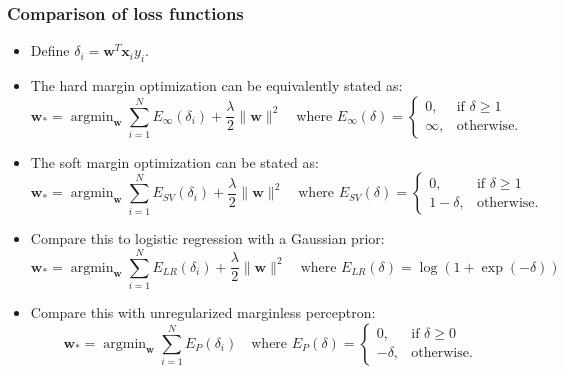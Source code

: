 \documentclass[ignorenonframetext,plain,fleqn]{beamer}
\DeclareMathOperator*{\argmin}{argmin}
\renewcommand{\vec}{\mathbf}
\begin{document}
\begin{frame}\frametitle{Comparison of loss functions} %
\small
\begin{itemize}
\item Define $\delta_i = \vec{w}^T\vec{x}_i y_i$.
\item The hard margin optimization can be equivalently stated as: \[
  \vec{w}_* = \argmin_\vec{w} \sum_{i=1}^N E_\infty(\delta_i) + \frac{\lambda}{2} \|\vec{w}\|^2
\quad\text{where }
E_\infty(\delta)=\begin{cases}
0,& \text{if } \delta \geq 1 \\
\infty,& \text{otherwise.}
\end{cases}
\]
\item The soft margin optimization can be stated as: \[
  \vec{w}_* = \argmin_\vec{w} \sum_{i=1}^N E_{SV}(\delta_i) + \frac{\lambda}{2} \|\vec{w}\|^2
\quad\text{where }
E_{SV}(\delta)=\begin{cases}
0,& \text{if } \delta \geq 1 \\
1-\delta,& \text{otherwise.}
\end{cases}
\]
\item Compare this to logistic regression with a Gaussian prior: \[
  \vec{w}_* = \argmin_\vec{w} \sum_{i=1}^N E_{LR}(\delta_i) + \frac{\lambda}{2} \|\vec{w}\|^2
\quad\text{where }
E_{LR}(\delta) = \log(1 + \exp(-\delta))
\]
\item Compare this with unregularized marginless perceptron: \[
  \vec{w}_* = \argmin_\vec{w} \sum_{i=1}^N E_P(\delta_i)
\quad\text{where }
E_{P}(\delta)=\begin{cases}
0,& \text{if } \delta \geq 0 \\
-\delta,& \text{otherwise.}
\end{cases}
\]
\end{itemize}
\end{frame}
\end{document}
